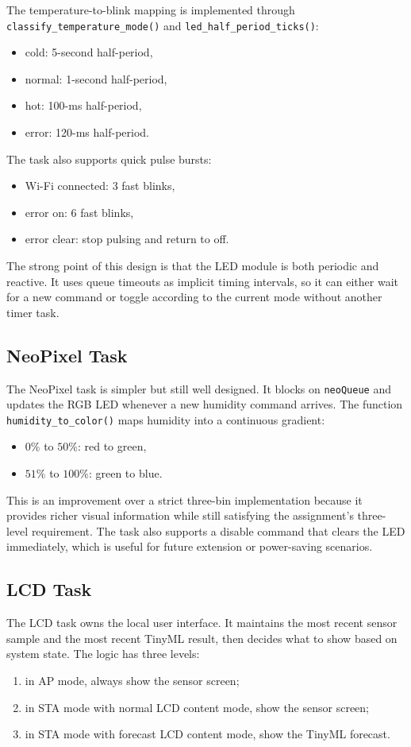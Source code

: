 The temperature-to-blink mapping is implemented through
\texttt{classify\_temperature\_mode()} and \texttt{led\_half\_period\_ticks()}:
\begin{itemize}
  \item cold: 5-second half-period,
  \item normal: 1-second half-period,
  \item hot: 100-ms half-period,
  \item error: 120-ms half-period.
\end{itemize}

The task also supports quick pulse bursts:
\begin{itemize}
  \item Wi-Fi connected: 3 fast blinks,
  \item error on: 6 fast blinks,
  \item error clear: stop pulsing and return to off.
\end{itemize}

The strong point of this design is that the LED module is both periodic and
reactive. It uses queue timeouts as implicit timing intervals, so it can either
wait for a new command or toggle according to the current mode without another
timer task.

\subsection{NeoPixel Task}
The NeoPixel task is simpler but still well designed. It blocks on
\texttt{neoQueue} and updates the RGB LED whenever a new humidity command
arrives. The function \texttt{humidity\_to\_color()} maps humidity into a
continuous gradient:
\begin{itemize}
  \item \(0\%\) to \(50\%\): red to green,
  \item \(51\%\) to \(100\%\): green to blue.
\end{itemize}

This is an improvement over a strict three-bin implementation because it
provides richer visual information while still satisfying the assignment's
three-level requirement. The task also supports a disable command that clears
the LED immediately, which is useful for future extension or power-saving
scenarios.

\subsection{LCD Task}
The LCD task owns the local user interface. It maintains the most recent sensor
sample and the most recent TinyML result, then decides what to show based on
system state. The logic has three levels:
\begin{enumerate}
  \item in AP mode, always show the sensor screen;
  \item in STA mode with normal LCD content mode, show the sensor screen;
  \item in STA mode with forecast LCD content mode, show the TinyML forecast.
\end{enumerate}

